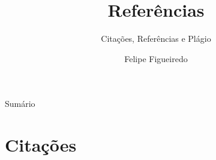 \documentclass{beamer}
\title%
{Referências}
\subtitle
{Citações, Referências e Plágio} %
\author%
{Felipe Figueiredo}%
\institute[INTO] %
{Instituto Nacional de Traumatologia e Ortopedia
}
\date%
{}
\begin{document}
\begin{frame}
  \titlepage
\end{frame}

\begin{frame}{Sumário}
  \tableofcontents
\end{frame}









\section{Citações}
\end{document}
